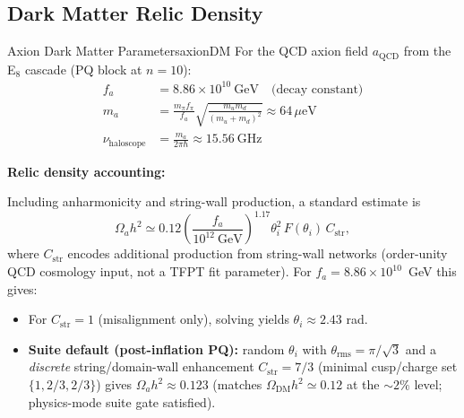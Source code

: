 \subsection{Dark Matter Relic Density}

\begin{theorem}{Axion Dark Matter Parameters}{axionDM}
For the QCD axion field $a_{\text{QCD}}$ from the E$_8$ cascade (PQ block at $n = 10$):
\begin{align}
    f_a &= 8.86 \times 10^{10}~\text{GeV} \quad \text{(decay constant)}\\
    m_a &= \frac{m_\pi f_\pi}{f_a}\sqrt{\frac{m_u m_d}{(m_u + m_d)^2}} \approx 64\,\mu\text{eV}\\
    \nu_{\text{haloscope}} &= \frac{m_a}{2\pi\hbar} \approx 15.56~\text{GHz}
\end{align}
\end{theorem}

\textbf{Relic density accounting:}

Including anharmonicity and string-wall production, a standard estimate is
\begin{equation}
    \Omega_a h^2 \simeq 0.12\left(\frac{f_a}{10^{12}~\text{GeV}}\right)^{1.17}\theta_i^2\,F(\theta_i)\,C_{\mathrm{str}},
\end{equation}
where $C_{\mathrm{str}}$ encodes additional production from string-wall networks (order-unity QCD cosmology input, not a TFPT fit parameter).
For $f_a = 8.86 \times 10^{10}$~GeV this gives:
\begin{itemize}[leftmargin=1.5em, topsep=2pt, itemsep=1pt]
    \item For $C_{\mathrm{str}}=1$ (misalignment only), solving yields $\theta_i \approx 2.43$ rad.
    \item \textbf{Suite default (post-inflation PQ):} random $\theta_i$ with $\theta_{\mathrm{rms}}=\pi/\sqrt{3}$ and a \emph{discrete} string/domain-wall enhancement $C_{\mathrm{str}}=7/3$ (minimal cusp/charge set $\{1,2/3,2/3\}$) gives $\Omega_a h^2 \approx 0.123$ (matches $\Omega_{\mathrm{DM}}h^2\simeq 0.12$ at the $\sim 2\%$ level; physics-mode suite gate satisfied).
\end{itemize}

